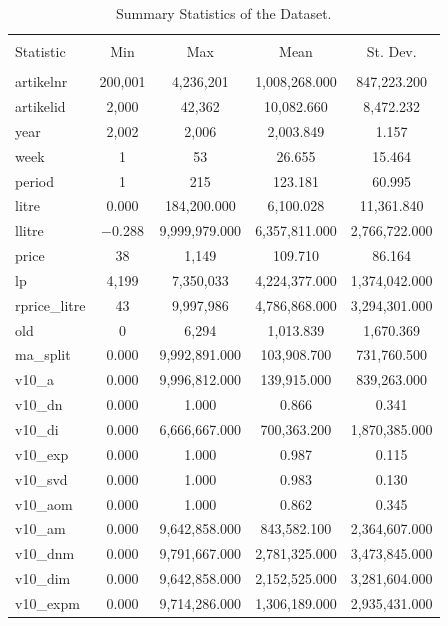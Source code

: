 \documentclass[11pt,]{article}
\begin{document}
\begin{table}[!htbp] \centering 
  \caption{Summary Statistics of the Dataset.} 
  \label{tab:SumStat} 
\small 
\begin{tabular}{@{\extracolsep{5pt}}lcccc} 
\\[-1.8ex]\hline 
\hline \\[-1.8ex] 
Statistic & \multicolumn{1}{c}{Min} & \multicolumn{1}{c}{Max} & \multicolumn{1}{c}{Mean} & \multicolumn{1}{c}{St. Dev.} \\ 
\hline \\[-1.8ex] 
artikelnr & 200,001 & 4,236,201 & 1,008,268.000 & 847,223.200 \\ 
artikelid & 2,000 & 42,362 & 10,082.660 & 8,472.232 \\ 
year & 2,002 & 2,006 & 2,003.849 & 1.157 \\ 
week & 1 & 53 & 26.655 & 15.464 \\ 
period & 1 & 215 & 123.181 & 60.995 \\ 
litre & 0.000 & 184,200.000 & 6,100.028 & 11,361.840 \\ 
llitre & $-$0.288 & 9,999,979.000 & 6,357,811.000 & 2,766,722.000 \\ 
price & 38 & 1,149 & 109.710 & 86.164 \\ 
lp & 4,199 & 7,350,033 & 4,224,377.000 & 1,374,042.000 \\ 
rprice\_litre & 43 & 9,997,986 & 4,786,868.000 & 3,294,301.000 \\ 
old & 0 & 6,294 & 1,013.839 & 1,670.369 \\ 
ma\_split & 0.000 & 9,992,891.000 & 103,908.700 & 731,760.500 \\ 
v10\_a & 0.000 & 9,996,812.000 & 139,915.000 & 839,263.000 \\ 
v10\_dn & 0.000 & 1.000 & 0.866 & 0.341 \\ 
v10\_di & 0.000 & 6,666,667.000 & 700,363.200 & 1,870,385.000 \\ 
v10\_exp & 0.000 & 1.000 & 0.987 & 0.115 \\ 
v10\_svd & 0.000 & 1.000 & 0.983 & 0.130 \\ 
v10\_aom & 0.000 & 1.000 & 0.862 & 0.345 \\ 
v10\_am & 0.000 & 9,642,858.000 & 843,582.100 & 2,364,607.000 \\ 
v10\_dnm & 0.000 & 9,791,667.000 & 2,781,325.000 & 3,473,845.000 \\ 
v10\_dim & 0.000 & 9,642,858.000 & 2,152,525.000 & 3,281,604.000 \\ 
v10\_expm & 0.000 & 9,714,286.000 & 1,306,189.000 & 2,935,431.000 \\ 

\end{tabular}
\end{table}
\end{document}
